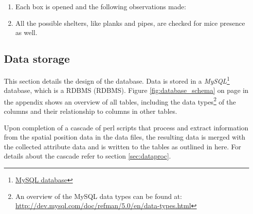 \begin{enumerate} 
\item Each box is opened and the following observations made:
\item All the possible shelters, like planks and pipes, are checked for mice presence as well.
\end{enumerate}

\subsection{Data storage}
\label{subsec:datastorage}

This section details the design of the database. Data is stored in a \textit{MySQL}\footnote{\href{http://www.mysql.com/}{MySQL database}} database, which is  a \acf{RDBMS} (RDBMS). Figure \ref{fig:database_schema} on page \pageref{fig:database_schema} in the appendix shows an overview of all tables, including the data types\footnote{An overview of the MySQL data types can be found at: \url{http://dev.mysql.com/doc/refman/5.0/en/data-types.html}} of the columns and their relationship to columns in other tables.

Upon completion of a cascade of \ac{perl} scripts that process and extract information from the spatial position data in the data files, the resulting data is merged with the collected attribute data and is written to the tables as outlined in here. For details about the cascade refer to section \ref{sec:dataproc}. 

